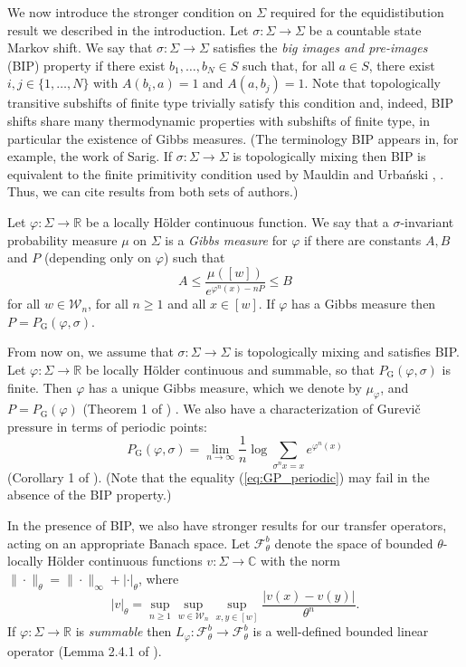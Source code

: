 \documentclass[11pt,letterpaper]{amsart}
\theoremstyle{definition}
\numberwithin{equation}{section}
\numberwithin{theorem}{section}
\def\R{\mathbb{R}}
\def\C{\mathbb{C}}
\def\vp{\varphi}
\def\R{\mathbb R}
\def\W{\mathcal W}
\def\PG{P_{\mathrm{G}}}
\begin{document}
We now introduce the stronger condition on $\Sigma$ required for the equidistibution result we described
in the introduction.
Let $\sigma : \Sigma \to \Sigma$ be a countable state Markov shift.
We say that $\sigma : \Sigma \to \Sigma$ satisfies the \emph{big images and pre-images} (BIP) property if
there exist $b_1,\ldots,b_N \in S$ such that, for all $a \in S$, there exist
$i,j \in \{1,\ldots,N\}$ with $A(b_i,a)=1$ and $A(a,b_j)=1$.
Note that topologically transitive subshifts of finite type trivially satisfy this condition and, indeed,
BIP shifts share many thermodynamic properties with subshifts of finite type, in particular the existence of Gibbs measures.
(The terminology BIP appears in, for example, the work of Sarig. 
If $\sigma : \Sigma \to \Sigma$ is topologically mixing then BIP
is equivalent to the finite primitivity condition
used by Mauldin and Urba\'nski \cite{MU2001}, \cite{MU2003}. Thus, we can cite results from both sets of authors.)




Let $\vp : \Sigma \to \R$ be a locally H\"older continuous function.
We say that a $\sigma$-invariant probability measure $\mu$ on $\Sigma$ is a 
\emph{Gibbs measure} for $\vp$ if there are constants $A,B$ and $P$
(depending only on $\vp$) such that
\[
A \le \frac{\mu([w])}{e^{\vp^n(x)-nP}} \le B
\]
for all $w \in \W_n$, for all $n \ge 1$ and all $x \in [w]$. 
If $\vp$ has a Gibbs measure then $P=\PG(\vp,\sigma)$.






From now on, we assume that $\sigma : \Sigma \to \Sigma$ is topologically mixing and satisfies BIP.
Let $\vp : \Sigma \to \R$ be locally H\"older continuous and summable, so that 
$\PG(\vp,\sigma)$ is finite. Then $\vp$ has a unique Gibbs measure, which we denote by $\mu_\vp$, and $P=\PG(\vp)$ (Theorem 1
of \cite{Sarig-PAMS}) .
We also have a characterization of Gurevi\v{c} pressure in terms of periodic points:
\begin{equation}\label{eq:GP_periodic}
\PG(\vp,\sigma) = \lim_{n \to \infty} \frac{1}{n} \log \sum_{\sigma^nx=x} e^{\vp^n(x)}
\end{equation}
(Corollary 1 of \cite{Sarig-PAMS}). (Note that the equality (\ref{eq:GP_periodic}) may fail 
in the absence of the BIP property.)


In the presence of BIP, we also have stronger results for our transfer operators, acting
on an appropriate Banach space.
Let $\mathcal F_\theta^b$ denote the space of bounded $\theta$-locally H\"older continuous functions
$v: \Sigma \to \C$ with the norm $\|\cdot\|_\theta = \|\cdot\|_\infty +|\cdot|_\theta$,
where
\[
|v|_\theta=
\sup_{n \ge 1} \sup_{w \in \W_n} \sup_{x,y \in [w]} \frac{|v(x)-v(y)|}{\theta^n}.
\]
If $\vp : \Sigma \to \R$ is \emph{summable} then
$L_\vp : \mathcal F_\theta^b \to \mathcal F_\theta^b$ is a well-defined bounded
linear operator (Lemma 2.4.1 of \cite{MU2003}).
\end{document}
